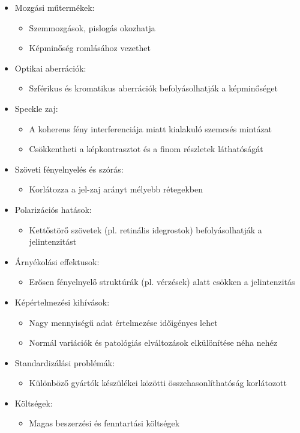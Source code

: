\documentclass[a4paper,12pt]{article}
\begin{document}
\begin{itemize}
\item Mozgási műtermékek: \begin{itemize} \item Szemmozgások, pislogás okozhatja \item Képminőség romlásához vezethet \end{itemize} \item Optikai aberrációk: \begin{itemize} \item Szférikus és kromatikus aberrációk befolyásolhatják a képminőséget \end{itemize} \item Speckle zaj: \begin{itemize} \item A koherens fény interferenciája miatt kialakuló szemcsés mintázat \item Csökkentheti a képkontrasztot és a finom részletek láthatóságát \end{itemize} \item Szöveti fényelnyelés és szórás: \begin{itemize} \item Korlátozza a jel-zaj arányt mélyebb rétegekben \end{itemize} \item Polarizációs hatások: \begin{itemize} \item Kettőstörő szövetek (pl. retinális idegrostok) befolyásolhatják a jelintenzitást \end{itemize} \item Árnyékolási effektusok: \begin{itemize} \item Erősen fényelnyelő struktúrák (pl. vérzések) alatt csökken a jelintenzitás \end{itemize} \item Képértelmezési kihívások: \begin{itemize} \item Nagy mennyiségű adat értelmezése időigényes lehet \item Normál variációk és patológiás elváltozások elkülönítése néha nehéz \end{itemize} \item Standardizálási problémák: \begin{itemize} \item Különböző gyártók készülékei közötti összehasonlíthatóság korlátozott \end{itemize} \item Költségek: \begin{itemize} \item Magas beszerzési és fenntartási költségek \end{itemize}
\end{itemize}
\end{document}

